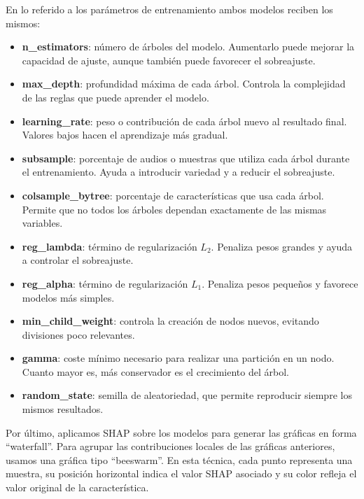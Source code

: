 En lo referido a los parámetros de entrenamiento ambos modelos reciben los mismos:
\begin{itemize}
    \item \textbf{n\_estimators}: número de árboles del modelo. Aumentarlo puede mejorar la capacidad de ajuste, aunque también puede favorecer el sobreajuste.
    
    \item \textbf{max\_depth}: profundidad máxima de cada árbol. Controla la complejidad de las reglas que puede aprender el modelo.
    
    \item \textbf{learning\_rate}: peso o contribución de cada árbol nuevo al resultado final. Valores bajos hacen el aprendizaje más gradual.
    
    \item \textbf{subsample}: porcentaje de audios o muestras que utiliza cada árbol durante el entrenamiento. Ayuda a introducir variedad y a reducir el sobreajuste.
    
    \item \textbf{colsample\_bytree}: porcentaje de características que usa cada árbol. Permite que no todos los árboles dependan exactamente de las mismas variables.
    
    \item \textbf{reg\_lambda}: término de regularización \(L_2\). Penaliza pesos grandes y ayuda a controlar el sobreajuste.
    
    \item \textbf{reg\_alpha}: término de regularización \(L_1\). Penaliza pesos pequeños y favorece modelos más simples.
    
    \item \textbf{min\_child\_weight}: controla la creación de nodos nuevos, evitando divisiones poco relevantes.
    
    \item \textbf{gamma}: coste mínimo necesario para realizar una partición en un nodo. Cuanto mayor es, más conservador es el crecimiento del árbol.
    
    \item \textbf{random\_state}: semilla de aleatoriedad, que permite reproducir siempre los mismos resultados.
\end{itemize}

Por último, aplicamos SHAP sobre los modelos para generar las gráficas en forma ``waterfall''. Para agrupar las contribuciones locales de las gráficas anteriores, usamos una gráfica tipo ``beeswarm''. En esta técnica, cada punto representa una muestra, su posición horizontal indica el valor SHAP asociado y su color refleja el valor original de la característica.




